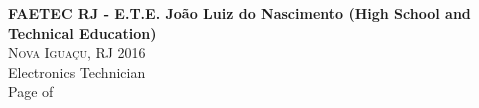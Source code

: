 \documentclass[oneside]{article}
\begin{document}
{\begin{minipage}[t][\dimexpr\textheight-2\fboxrule-2\fboxsep\relax][t]{\dimexpr0.6\textwidth-2\fboxrule-2\fboxsep\relax}
        {\large \textbf{FAETEC RJ - E.T.E. João Luiz do Nascimento (High School and Technical Education)}} \\
        {\scshape{}\selectfont\footnotesize Nova Iguaçu, RJ  \textendash{} 2016} \\
        {Electronics Technician} \\[1ex]
        \vfill%
        {\hfill\small{}\selectfont Page \thepage of \pageref{LastPage}\hfill}
    \end{minipage}
}%
\end{document}
